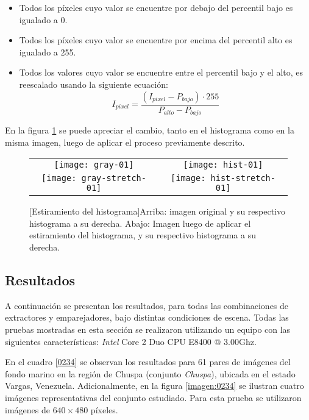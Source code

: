 \begin{itemize}
	\item Todos los píxeles cuyo valor se encuentre por debajo del percentil bajo es igualado a 0.
	\item Todos los píxeles cuyo valor se encuentre por encima del percentil alto es igualado a 255.
	\item Todos los valores cuyo valor se encuentre entre el percentil bajo y el alto, es reescalado usando la siguiente ecuación: 
	\begin{displaymath}
		I_{pixel} = \frac{(I_{pixel} - P_{bajo}) \cdot 255}{P_{alto} - P_{bajo}}
	\end{displaymath}
\end{itemize}

En la figura \ref{imagen:stretch} se puede apreciar el cambio, tanto en el histograma como en la misma imagen, luego de aplicar el proceso previamente descrito.


\begin{figure}[h]
	\centering
	\vspace{0.6cm}
	\begin{tabular}{@{}cc@{}}
		\texttt{[image: gray-01]} &
		\texttt{[image: hist-01]} \\
		\texttt{[image: gray-stretch-01]} &
		\texttt{[image: hist-stretch-01]}
	\end{tabular}
	[Estiramiento del histograma]{Arriba: imagen original y su respectivo histograma a su derecha. Abajo: Imagen luego de aplicar el estiramiento del histograma, y su respectivo histograma a su derecha.}
	\label{imagen:stretch}
\end{figure}


\subsection{Resultados}

A continuación se presentan los resultados, para todas las combinaciones de extractores y emparejadores, bajo distintas condiciones de escena. Todas las pruebas mostradas en esta sección se realizaron utilizando un equipo con las siguientes características:  \textit{Intel\textsuperscript \textregistered } Core 2 Duo CPU E8400 @ 3.00Ghz.

En el cuadro \ref{0234} se observan los resultados para 61 pares de imágenes del fondo marino en la región de Chuspa (conjunto \textit{Chuspa}), ubicada en el estado Vargas, Venezuela. Adicionalmente, en la figura \ref{imagen:0234} se ilustran cuatro imágenes representativas del conjunto estudiado. Para esta prueba se utilizaron imágenes de $640\times480$ píxeles.

